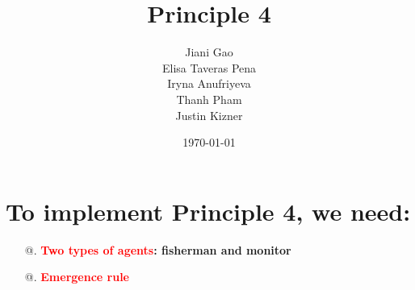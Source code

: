\documentclass[12pt]{article}
\title{\bf Principle 4 }
\author{Jiani Gao\\Elisa Taveras Pena\\Iryna Anufriyeva\\ Thanh Pham\\ Justin Kizner}
\affil{Department of Economics, Binghamton University}
\date{\today}
\makeatletter
\newcommand{\Rmnum}[1]{\expandafter\@slowromancap\romannumeral #1@}
\makeatother
\begin{document}
\maketitle
\newpage

\newpage
\noindent

\section{To implement Principle 4, we need:}
\begin{itemize}
\item[\Rmnum{1}.] 
 \textbf{\textcolor{red}{Two types of agents}: fisherman and monitor}
 \item[\Rmnum{2}.]
\textbf{\textcolor{red}{Emergence rule}}
\end{itemize}
 
\end{document}
